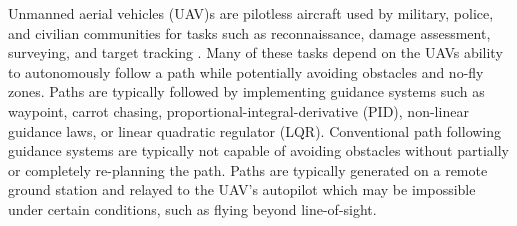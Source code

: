 \documentclass[conf]{new-aiaa}
\begin{document}
%
%
Unmanned aerial vehicles (UAV)s are pilotless aircraft used by military, police, and civilian communities for tasks such as reconnaissance, damage assessment, surveying, and target tracking \cite{ariyur_autonomous_2008,teuliere_chasing_2011}. Many of these tasks depend on the UAVs ability to autonomously follow a path while potentially avoiding obstacles and no-fly zones. Paths are typically followed by implementing guidance systems such as waypoint, carrot chasing, proportional-integral-derivative (PID), non-linear guidance laws, or linear quadratic regulator (LQR). Conventional path following guidance systems are typically not capable of avoiding obstacles without partially or completely re-planning the path. Paths are typically generated on a remote ground station and relayed to the UAV’s autopilot which may be impossible under certain conditions, such as flying beyond line-of-sight.\\
\end{document}
